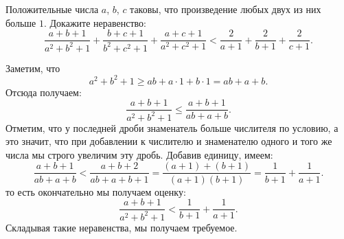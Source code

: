 Положительные числа $a$, $b$, $c$ таковы, что произведение любых двух из них
больше $1$.
Докажите неравенство:
\[
   \frac{a + b + 1}{a^2 + b^2 + 1}
   +
   \frac{b + c + 1}{b^2 + c^2 + 1}
   +
   \frac{a + c + 1}{a^2 + c^2 + 1}
<
   \frac{2}{a + 1} + \frac{2}{b + 1} + \frac{2}{c + 1}
.\]

\solution
Заметим, что
\[
   a^2 + b^2 + 1
\geq
   a b + a \cdot 1 + b \cdot 1
=
   a b + a + b
.\]
Отсюда получаем:
\[
   \frac{a + b + 1}{a^2 + b^2 + 1}
\leq
   \frac{a + b + 1}{a b + a + b}
.\]
Отметим, что у последней дроби знаменатель больше числителя по условию, а это
значит, что при добавлении к числителю и знаменателю одного и того же числа мы
строго увеличим эту дробь.
Добавив единицу, имеем:
\[
   \frac{a + b + 1}{a b + a + b}
<
   \frac{a + b + 2}{a b + a + b + 1}
=
   \frac{(a + 1) + (b + 1)}{(a + 1) (b + 1)}
=
   \frac{1}{b + 1}
   +
   \frac{1}{a + 1}
.\]
то есть окончательно мы получаем оценку:
\[
   \frac{a + b + 1}{a^2 + b^2 + 1}
<
   \frac{1}{b + 1} + \frac{1}{a + 1}
.\]
Складывая такие неравенства, мы получаем требуемое.

